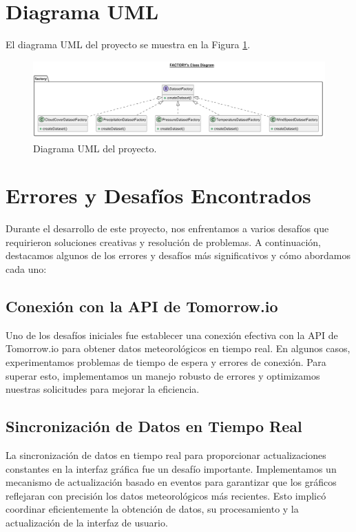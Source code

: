 \documentclass{article}
\begin{document}
\section{Diagrama UML}
El diagrama UML del proyecto se muestra en la Figura \ref{fig:uml}.

\begin{figure}[H]
    \centering
    \includegraphics[width=1.0\textwidth]{images/image7.png}
    \caption{Diagrama UML del proyecto.}
    \label{fig:uml}
\end{figure}

\section{Errores y Desafíos Encontrados}
Durante el desarrollo de este proyecto, nos enfrentamos a varios desafíos que requirieron soluciones creativas y resolución de problemas. A continuación, destacamos algunos de los errores y desafíos más significativos y cómo abordamos cada uno:

\subsection{Conexión con la API de Tomorrow.io}
Uno de los desafíos iniciales fue establecer una conexión efectiva con la API de Tomorrow.io para obtener datos meteorológicos en tiempo real. En algunos casos, experimentamos problemas de tiempo de espera y errores de conexión. Para superar esto, implementamos un manejo robusto de errores y optimizamos nuestras solicitudes para mejorar la eficiencia.

\subsection{Sincronización de Datos en Tiempo Real}
La sincronización de datos en tiempo real para proporcionar actualizaciones constantes en la interfaz gráfica fue un desafío importante. Implementamos un mecanismo de actualización basado en eventos para garantizar que los gráficos reflejaran con precisión los datos meteorológicos más recientes. Esto implicó coordinar eficientemente la obtención de datos, su procesamiento y la actualización de la interfaz de usuario.
\end{document}
